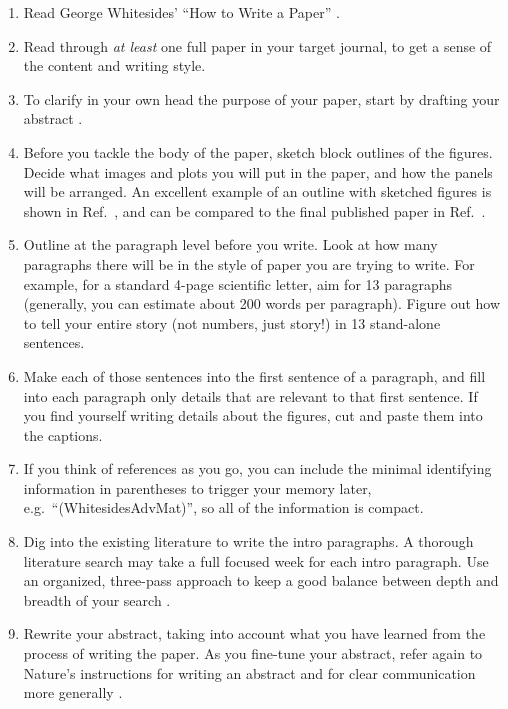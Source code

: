 \documentclass[aps,prb,twocolumn,superscriptaddress,floatfix,longbibliography]{revtex4-2}
\newcounter{para}
\begin{document}
\begin{enumerate}
\item Read George Whitesides' ``How to Write a Paper'' \cite{WhitesidesAdvMat2004}.

\item Read through \emph{at least} one full paper in your target journal, to get a sense of the content and writing style.

\item To clarify in your own head the purpose of your paper, start by drafting your abstract \cite{NatureAbstract}.

\item Before you tackle the body of the paper, sketch block outlines of the figures. Decide what images and plots you will put in the paper, and how the panels will be arranged. An excellent example of an outline with sketched figures is shown in Ref.\ \cite{GardeziOutline2}, and can be compared to the final published paper in Ref.\ \cite{Gardezi2DMat2020}.

\item Outline at the paragraph level before you write. Look at how many paragraphs there will be in the style of paper you are trying to write. For example, for a standard 4-page scientific letter, aim for 13 paragraphs (generally, you can estimate about 200 words per paragraph). Figure out how to tell your entire story (not numbers, just story!) in 13 stand-alone sentences.

\item Make each of those sentences into the first sentence of a paragraph, and fill into each paragraph only details that are relevant to that first sentence. If you find yourself writing details about the figures, cut and paste them into the captions.

\item If you think of references as you go, you can include the minimal identifying information in parentheses to trigger your memory later, e.g.\ ``(WhitesidesAdvMat)'', so all of the information is compact.

\item Dig into the existing literature to write the intro paragraphs. A thorough literature search may take a full focused week for each intro paragraph. Use an organized, three-pass approach to keep a good balance between depth and breadth of your search \cite{KeshavSIGCOMM2007}.

\item Rewrite your abstract, taking into account what you have learned from the process of writing the paper. As you fine-tune your abstract, refer again to Nature's instructions for writing an abstract \cite{NatureAbstract} and for clear communication more generally \cite{NatNeuro2000}.
\end{enumerate}
\vspace{2mm}
\end{document}
